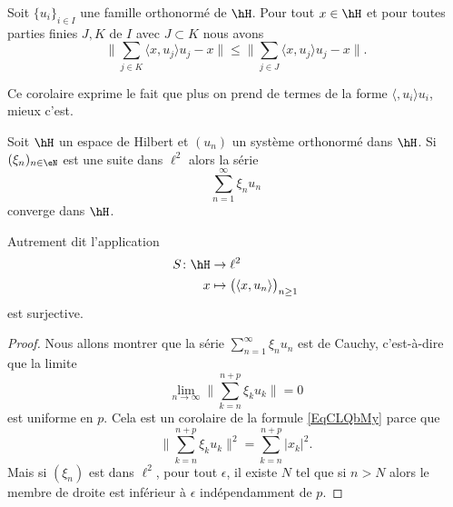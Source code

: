 \begin{corollary}
	Soit \( \{ u_i \}_{i\in I}\) une famille orthonormé de \( \hH\). Pour tout \( x\in \hH\) et pour toutes parties finies \( J,K\) de \( I\) avec \( J\subset K\) nous avons
	\begin{equation}
		\| \sum_{j\in K}\langle x, u_j\rangle u_j-x \|\leq \| \sum_{j\in J}\langle x, u_j\rangle u_j-x \|.
	\end{equation}
\end{corollary}
Ce corolaire exprime le fait que plus on prend de termes de la forme \( \langle , u_i\rangle u_i\), mieux c'est.

\begin{proposition}     \label{PropzaKXHq}
	Soit \( \hH\) un espace de Hilbert et \( (u_n)\) un système orthonormé dans \( \hH\). Si \( (\xi_n)_{n\in \eN}\) est une suite dans \( \ell^2\) alors la série
	\begin{equation}
		\sum_{n=1}^{\infty}\xi_nu_n
	\end{equation}
	converge dans \( \hH\).

	Autrement dit l'application
	\begin{equation}
		\begin{aligned}
			S\colon \hH & \to \ell^2                                           \\
			x           & \mapsto \big( \langle x, u_n\rangle  \big)_{n\geq 1}
		\end{aligned}
	\end{equation}
	est surjective.
\end{proposition}

\begin{proof}
	Nous allons montrer que la série \( \sum_{n=1}^{\infty}\xi_nu_n\) est de Cauchy, c'est-à-dire que la limite
	\begin{equation}
		\lim_{n\to \infty} \big\| \sum_{k=n}^{n+p}\xi_ku_k \big\|=0
	\end{equation}
	est uniforme en \( p\). Cela est un corolaire de la formule \eqref{EqCLQbMy} parce que
	\begin{equation}
		\big\| \sum_{k=n}^{n+p}\xi_ku_k \big\|^2=\sum_{k=n}^{n+p}| x_k |^2.
	\end{equation}
	Mais si \( (\xi_n)\) est dans \( \ell^2\), pour tout \( \epsilon\), il existe \( N\) tel que si \( n>N\) alors le membre de droite est inférieur à \( \epsilon\) indépendamment de \( p\).
\end{proof}

